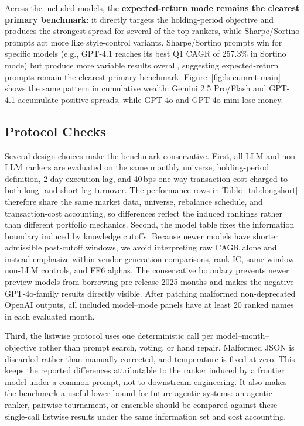 Across the included models, the \textbf{expected-return mode remains the clearest primary benchmark}: it directly targets the holding-period objective and produces the strongest spread for several of the top rankers, while Sharpe/Sortino prompts act more like style-control variants.
Sharpe/Sortino prompts win for specific models (e.g., GPT-4.1 reaches its best Q1 CAGR of 257.3\% in Sortino mode) but produce more variable results overall, suggesting expected-return prompts remain the clearest primary benchmark.
Figure~\ref{fig:ls-cumret-main} shows the same pattern in cumulative wealth: Gemini 2.5 Pro/Flash and GPT-4.1 accumulate positive spreads, while GPT-4o and GPT-4o mini lose money.

\subsection{Protocol Checks}

Several design choices make the benchmark conservative.
First, all LLM and non-LLM rankers are evaluated on the same monthly universe, holding-period definition, 2-day execution lag, and 40\,bps one-way transaction cost charged to both long- and short-leg turnover.
The performance rows in Table~\ref{tab:longshort} therefore share the same market data, universe, rebalance schedule, and transaction-cost accounting, so differences reflect the induced rankings rather than different portfolio mechanics.
Second, the model table fixes the information boundary induced by knowledge cutoffs.
Because newer models have shorter admissible post-cutoff windows, we avoid interpreting raw CAGR alone and instead emphasize within-vendor generation comparisons, rank IC, same-window non-LLM controls, and FF6 alphas.
The conservative boundary prevents newer preview models from borrowing pre-release 2025 months and makes the negative GPT-4o-family results directly visible.
After patching malformed non-deprecated OpenAI outputs, all included model--mode panels have at least 20 ranked names in each evaluated month.

Third, the listwise protocol uses one deterministic call per model--month--objective rather than prompt search, voting, or hand repair.
Malformed JSON is discarded rather than manually corrected, and temperature is fixed at zero.
This keeps the reported differences attributable to the ranker induced by a frontier model under a common prompt, not to downstream engineering.
It also makes the benchmark a useful lower bound for future agentic systems: an agentic ranker, pairwise tournament, or ensemble should be compared against these single-call listwise results under the same information set and cost accounting.


